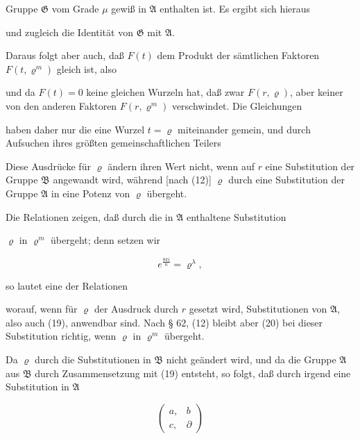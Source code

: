 Gruppe $\mathfrak{G}$ vom Grade $\mu$ gewiß in $\mathfrak{A}$ enthalten ist. Es ergibt sich hieraus


und zugleich die Identität von $\mathfrak{G}$ mit $\mathfrak{A}$.

Daraus folgt aber auch, daß $F(t)$ dem Produkt der sämtlichen Faktoren $F(t,\varrho^m)$ gleich ist, also


und da $F(t) = 0$ keine gleichen Wurzeln hat, daß zwar $F(r,\varrho)$, aber keiner von den anderen Faktoren $F(r,\varrho^m)$ verschwindet. Die Gleichungen


haben daher nur die eine Wurzel $t = \varrho$ miteinander gemein, und durch Aufsuchen ihres größten gemeinschaftlichen Teilers 

Diese Ausdrücke für $\varrho$ ändern ihren Wert nicht, wenn auf $r$ eine Substitution der Gruppe $\mathfrak{B}$ angewandt wird, während [nach (12)] $\varrho$ durch eine Substitution der Gruppe $\mathfrak{A}$ in eine Potenz von $\varrho$ übergeht.

Die  Relationen zeigen, daß durch die in $\mathfrak{A}$ enthaltene Substitution


$\varrho$ in $\varrho^m$ übergeht; denn setzen wir

\[
e^{\frac{8\pi i}{n}} = \varrho^\lambda,
\]

so lautet eine der  Relationen


worauf, wenn für $\varrho$ der Ausdruck durch $r$ gesetzt wird,  Substitutionen von $\mathfrak{A}$, also auch (19), anwendbar sind. Nach § 62, (12) bleibt aber (20) bei dieser Substitution  richtig, wenn $\varrho$ in $\varrho^m$ übergeht.

Da $\varrho$ durch die Substitutionen in $\mathfrak{B}$ nicht geändert wird, und da die Gruppe $\mathfrak{A}$ aus $\mathfrak{B}$ durch Zusammensetzung mit (19) entsteht, so folgt, daß durch irgend eine Substitution in $\mathfrak{A}$

\[
\begin{pmatrix} a, & b \\ c, & \partial \end{pmatrix}
\]
